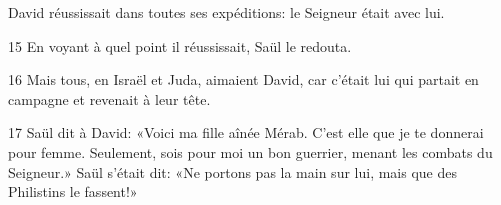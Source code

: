 
David réussissait dans toutes ses expéditions: le Seigneur était avec lui.

15 En voyant à quel point il réussissait, Saül le redouta.

16 Mais tous, en Israël et Juda, aimaient David, car c’était lui qui partait en campagne et revenait à leur tête.

17 Saül dit à David: «Voici ma fille aînée Mérab. C’est elle que je te donnerai pour femme. Seulement, sois pour moi un bon guerrier, menant les combats du Seigneur.» Saül s’était dit: «Ne portons pas la main sur lui, mais que des Philistins le fassent!»
